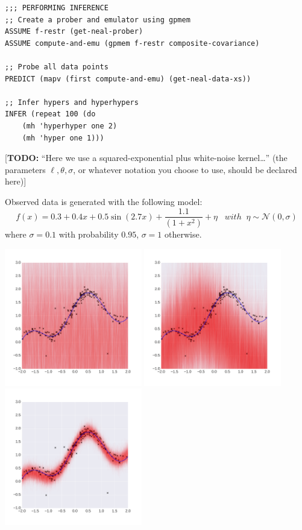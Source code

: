 \documentclass[a0,portrait]{a0poster}
\begin{document}
\begin{multicols}{3}
\begin{minipage}{\linewidth}
\begin{lstlisting}[frame=single,caption=Hierarchical  GP Smoothing,mathescape,label=alg:gphierarch]
;;; PERFORMING INFERENCE
;; Create a prober and emulator using gpmem
ASSUME f-restr (get-neal-prober)
ASSUME compute-and-emu (gpmem f-restr composite-covariance)

;; Probe all data points
PREDICT (mapv (first compute-and-emu) (get-neal-data-xs))

;; Infer hypers and hyperhypers
INFER (repeat 100 (do
    (mh 'hyperhyper one 2)
    (mh 'hyper one 1)))

\end{lstlisting}
\end{minipage}

[\textbf{TODO:} ``Here we use a squared-exponential plus white-noise kernel\ldots'' (the parameters $\ell,\theta,\sigma$, or whatever notation you choose to use, should be declared here)]

Observed data is generated with the following model: 
\begin{equation*}
f(x) =  0.3 + 0.4 x + 0.5 \sin(2.7x) + \frac{1.1}{(1+ x^2)} + \eta \;\;\; with\;\;\eta \sim \mathcal{N}(0,\sigma)
\end{equation*} where $\sigma = 0.1$ with probability $0.95$, $\sigma = 1$ otherwise.
\begin{center}
\includegraphics[width=6cm]{neal_se_1final.png}
\includegraphics[width=6cm]{neal_se_2final.png}
\includegraphics[width=6cm]{neal_se_3final.png}

\end{center}
\end{multicols}
\end{document}
